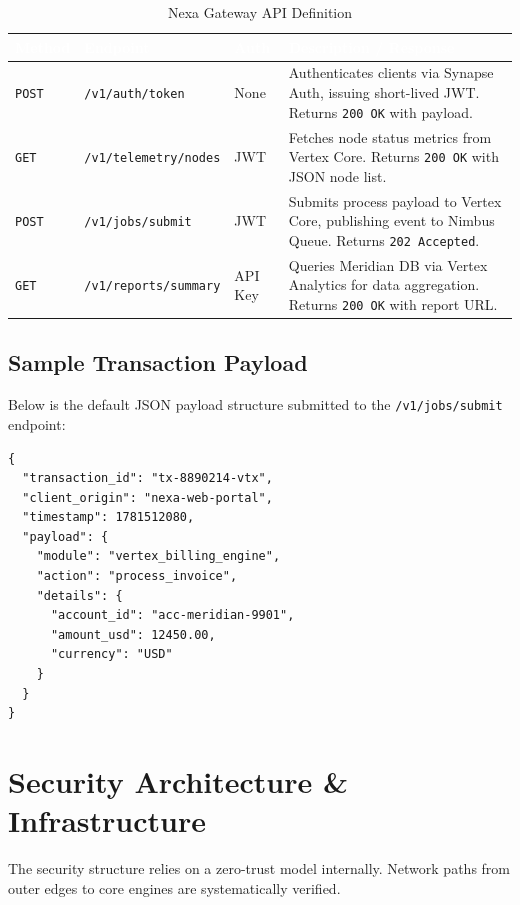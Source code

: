 \documentclass[11pt,a4paper]{article}
\begin{document}
\begin{table}[h]
\centering
\sffamily\small
\begin{tabularx}{\linewidth}{|l|l|l|X|}
\hline
\rowcolor{primary}
\textcolor{white}{\textbf{Method}} & \textcolor{white}{\textbf{Endpoint}} & \textcolor{white}{\textbf{Auth}} & \textcolor{white}{\textbf{Description / Response}} \\
\hline
\texttt{POST} & \texttt{/v1/auth/token} & None & Authenticates clients via Synapse Auth, issuing short-lived JWT. Returns \texttt{200 OK} with payload. \\
\hline
\rowcolor{lightbg}
\texttt{GET} & \texttt{/v1/telemetry/nodes} & JWT & Fetches node status metrics from Vertex Core. Returns \texttt{200 OK} with JSON node list. \\
\hline
\texttt{POST} & \texttt{/v1/jobs/submit} & JWT & Submits process payload to Vertex Core, publishing event to Nimbus Queue. Returns \texttt{202 Accepted}. \\
\hline
\rowcolor{lightbg}
\texttt{GET} & \texttt{/v1/reports/summary} & API Key & Queries Meridian DB via Vertex Analytics for data aggregation. Returns \texttt{200 OK} with report URL. \\
\hline
\end{tabularx}
\caption{Nexa Gateway API Definition}
\end{table}

\subsection{Sample Transaction Payload}
Below is the default JSON payload structure submitted to the \texttt{/v1/jobs/submit} endpoint:

\begin{lstlisting}[caption=Transaction Request JSON Payload]
{
  "transaction_id": "tx-8890214-vtx",
  "client_origin": "nexa-web-portal",
  "timestamp": 1781512080,
  "payload": {
    "module": "vertex_billing_engine",
    "action": "process_invoice",
    "details": {
      "account_id": "acc-meridian-9901",
      "amount_usd": 12450.00,
      "currency": "USD"
    }
  }
}
\end{lstlisting}

\section{Security Architecture \& Infrastructure}
The security structure relies on a zero-trust model internally. Network paths from outer edges to core engines are systematically verified.
\end{document}
